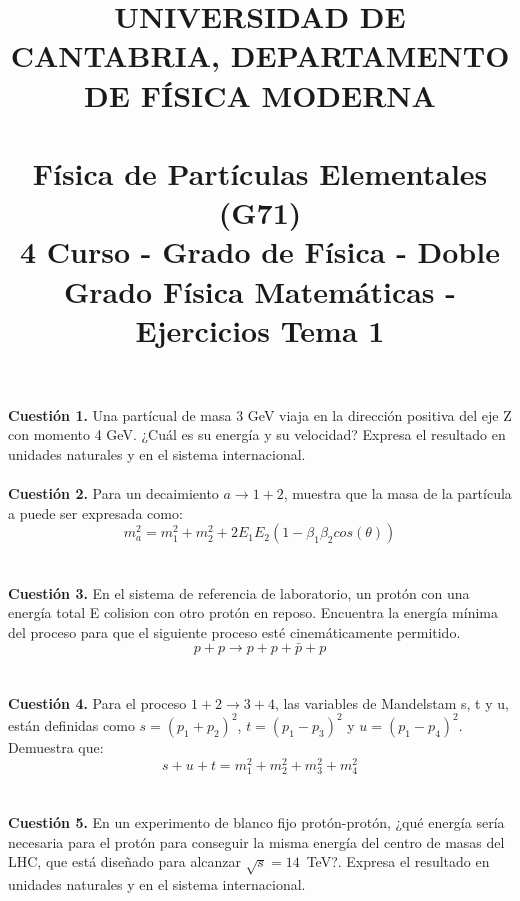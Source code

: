 \documentclass[paper=a4, fontsize=11pt]{scrartcl} %
\date{}
\title{	
\normalfont \normalsize 
\textsc{UNIVERSIDAD DE CANTABRIA, DEPARTAMENTO DE FÍSICA MODERNA} \\ [20pt] %
\horrule{0.5pt} \\[0.4cm] %
\huge Física de Partículas Elementales (G71) \\ %
\normalsize 4 Curso - Grado de Física - Doble Grado Física Matemáticas - Ejercicios Tema 1
\horrule{2pt} \\[0.5cm] %
}
\numberwithin{equation}{section} %
\numberwithin{figure}{section} %
\numberwithin{table}{section} %
\begin{document}
\maketitle %

\vspace{-2.5cm}

\textbf{Cuestión 1.} Una partícual de masa 3 GeV viaja en la dirección positiva del eje Z con momento 4 GeV. ¿Cuál es su energía y su velocidad? Expresa el resultado en unidades naturales y en el sistema internacional.
\\
\\
\textbf{Cuestión 2.} Para un decaimiento $a\rightarrow 1 + 2$, muestra que la masa de la partícula a puede ser expresada como:
\begin{equation*}
m_{a}^2 = m_1^2 + m_2^2 + 2E_1E_2(1-\beta_1\beta_2cos(\theta))
\end{equation*}
\\
\\
\textbf{Cuestión 3.} En el sistema de referencia de laboratorio, un protón con una energía total E colision con otro protón en reposo. Encuentra la energía mínima del proceso para
que el siguiente proceso esté cinemáticamente permitido.
\begin{equation*}
p + p \rightarrow p + p + \bar{p} + p
\end{equation*}
\\
\\
\textbf{Cuestión 4.} Para el proceso $1 + 2 \rightarrow 3 + 4$, las variables de Mandelstam s, t y u, están definidas como $s = (p_1+p_2)^2$, $t = (p_1-p_3)^2$ y $u = (p_1-p_4)^2$. Demuestra que:
\begin{equation*}
s + u + t = m_1^2 + m_2^2 + m_3^2 + m_4^2
\end{equation*}
\\
\\
\textbf{Cuestión 5.} En un experimento de blanco fijo protón-protón, ¿qué energía sería necesaria para el protón para conseguir la misma energía del centro de masas del LHC, que está diseñado para
alcanzar $\sqrt{s}=14$~TeV?. Expresa el resultado en unidades naturales y en el sistema internacional.
\end{document}
